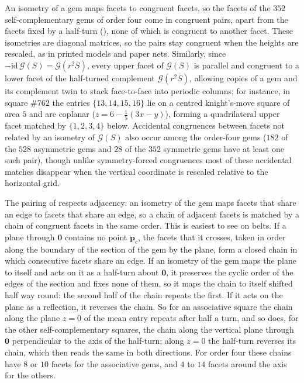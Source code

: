 \begin{remark}
\label{rem:congruent-facets}
An isometry of a gem maps facets to congruent facets, so the facets of the $352$ self-complementary gems of order four come in congruent pairs, apart from the facets fixed by a half-turn (), none of which is congruent to another facet.
These isometries are diagonal matrices, so the pairs stay congruent when the heights are rescaled, as in printed models and paper nets.
Similarly, since $-\mathrm{id}\,\mathcal G(S)=\mathcal G(r^2\overline S)$, every upper facet of $\mathcal G(S)$ is parallel and congruent to a lower facet of the half-turned complement $\mathcal G(r^2\overline S)$, allowing copies of a gem and its complement twin to stack face-to-face into periodic columns; for instance, in square $\#762$ the entries $\{13,14,15,16\}$ lie on a centred knight's-move square of area $5$ and are coplanar ($z=6-\frac15(3x-y)$), forming a quadrilateral upper facet matched by $\{1,2,3,4\}$ below.
Accidental congruences between facets not related by an isometry of $\mathcal G(S)$ also occur among the order-four gems ($182$ of the $528$ asymmetric gems and $28$ of the $352$ symmetric gems have at least one such pair), though unlike symmetry-forced congruences most of these accidental matches disappear when the vertical coordinate is rescaled relative to the horizontal grid.
\end{remark}

\begin{remark}
\label{rem:belts}
The pairing of  respects adjacency: an isometry of the gem maps facets that share an edge to facets that share an edge, so a chain of adjacent facets is matched by a chain of congruent facets in the same order.
This is easiest to see on belts.
If a plane through $\mathbf 0$ contains no point $\mathbf p_c$, the facets that it crosses, taken in order along the boundary of the section of the gem by the plane, form a closed chain in which consecutive facets share an edge.
If an isometry of the gem maps the plane to itself and acts on it as a half-turn about $\mathbf 0$, it preserves the cyclic order of the edges of the section and fixes none of them, so it maps the chain to itself shifted half way round: the second half of the chain repeats the first. If it acts on the plane as a reflection, it reverses the chain.
So for an associative square the chain along the plane $z=0$ of the mean entry repeats after half a turn, and so does, for the other self-complementary squares, the chain along the vertical plane through $\mathbf 0$ perpendicular to the axis of the half-turn; along $z=0$ the half-turn reverses its chain, which then reads the same in both directions.
For order four these chains have $8$ or $10$ facets for the associative gems, and $4$ to $14$ facets around the axis for the others.
\end{remark}
